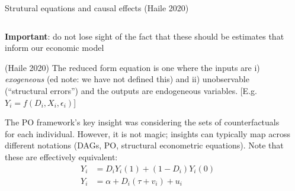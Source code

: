 \documentclass[notes,11pt, aspectratio=169]{beamer}
\newenvironment{wideitemize}{\itemize\addtolength{\itemsep}{10pt}}{\enditemize}
\begin{document}
\begin{frame}{Strutural equations and causal effects (Haile 2020)}
\begin{columns}[T] %
  \begin{column}{.7\textwidth}
    \begin{wideitemize}
    \item \textbf{Important}: do not lose sight of the fact that these
      should be estimates that inform our economic model
    \item (Haile 2020) The reduced form equation is one where the
      inputs are i) \emph{exogeneous} (ed note: we have not defined
      this) and ii) unobservable (``structural errors'') and the outputs
      are endogeneous variables. [E.g. $Y_{i} = f(D_{i}, X_{i}, \epsilon_{i})$]
    \item The PO framework's key insight was considering the sets of
      counterfactuals for each individual. However, it is not magic;
      insights can typically map across different notations (DAGs, PO,
      structural econometric equations).  Note that these are
      effectively equivalent:
      \begin{align*}
        Y_{i} &= D_{i}Y_{i}(1) + (1-D_{i})Y_{i}(0)\\
        Y_{i} &= \alpha + D_{i}(\tau + v_{i}) + u_{i}        
      \end{align*}
    \end{wideitemize}
  \end{column}%
  \hfill%
  \begin{column}{.5\textwidth}
  \end{column}
\end{columns}
\end{frame}
\end{document}

